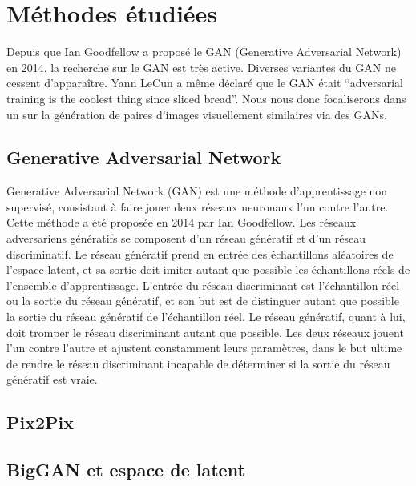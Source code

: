 \chapter{Méthodes étudiées}
Depuis que Ian Goodfellow a proposé le GAN (Generative Adversarial Network) en 2014, la recherche sur le GAN est très active. Diverses variantes du GAN ne cessent d'apparaître. Yann LeCun a même déclaré que le GAN était “adversarial training is the coolest thing since sliced bread”. Nous nous donc focaliserons dans un sur la génération de paires d’images visuellement similaires via des GANs. 

\section{Generative Adversarial Network}

Generative Adversarial Network (GAN) est une méthode d'apprentissage non supervisé, consistant à faire jouer deux réseaux neuronaux l'un contre l'autre. Cette méthode a été proposée en 2014 par Ian Goodfellow\cite{goodfellow2014generative}. Les réseaux adversariens génératifs se composent d'un réseau génératif et d'un réseau discriminatif. Le réseau génératif prend en entrée des échantillons aléatoires de l'espace latent, et sa sortie doit imiter autant que possible les échantillons réels de l'ensemble d'apprentissage. L'entrée du réseau discriminant est l'échantillon réel ou la sortie du réseau génératif, et son but est de distinguer autant que possible la sortie du réseau génératif de l'échantillon réel. Le réseau génératif, quant à lui, doit tromper le réseau discriminant autant que possible. Les deux réseaux jouent l'un contre l'autre et ajustent constamment leurs paramètres, dans le but ultime de rendre le réseau discriminant incapable de déterminer si la sortie du réseau génératif est vraie.

\section{Pix2Pix}

\section{BigGAN et espace de latent}